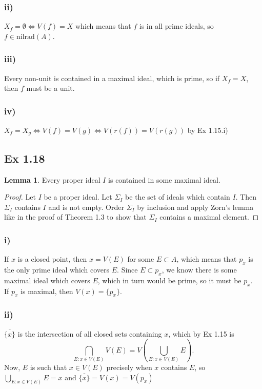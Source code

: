 \documentclass{article}
\theoremstyle{definition}
\newtheorem{lemma}[theorem]{Lemma}
\newcommand{\nr}{\text{nilrad}}
\begin{document}
\subsubsection*{ii)}
$X_f = \emptyset \Leftrightarrow V(f) = X$ which means that $f$ is in all prime ideals, so $f \in \nr(A)$.

\subsubsection*{iii)}
Every non-unit is contained in a maximal ideal, which is prime, so if $X_f = X$, then $f$ must be a unit.

\subsubsection*{iv)}
$X_f = X_g \Leftrightarrow V(f) = V(g) \Leftrightarrow V(r(f)) = V(r(g))$ by Ex 1.15.i)

\subsection*{Ex 1.18}

\begin{lemma}
	Every proper ideal $I$ is contained in some maximal ideal.
\end{lemma}
\begin{proof}
	Let $I$ be a proper ideal. Let $\Sigma_I$ be the set of ideals which contain
	$I$. Then $\Sigma_I$ contains $I$ and is not empty. Order $\Sigma_I$ by
	inclusion and apply Zorn's lemma like in the proof of Theorem 1.3 to show that
	$\Sigma_I$ contains a maximal element.
\end{proof}

\subsubsection*{i)}
If $x$ is a closed point, then $x = V(E)$ for some $E \subset A$, which means that $p_x$ is the only prime ideal which covers $E$. Since $E \subset p_x$, we know there is some maximal ideal which covers $E$, which in turn would be prime, so it must be $p_x$. \\

If $p_x$ is maximal, then $V(x) = \{p_x\}$.

\subsubsection*{ii)}
$\overline{\{x\}}$ is the intersection of all closed sets containing $x$, which by Ex 1.15 is
$$
	\bigcap_{E : x \in V(E)} V(E) = V \left( \bigcup_{E : x \in V(E)} E \right).
$$
Now, $E$ is such that $x \in V(E)$ precisely when $x$ contains $E$, so $\bigcup_{E : x \in V(E)} E = x$ and $\overline{\{x\}} = V(x) = V(p_x)$
\end{document}
